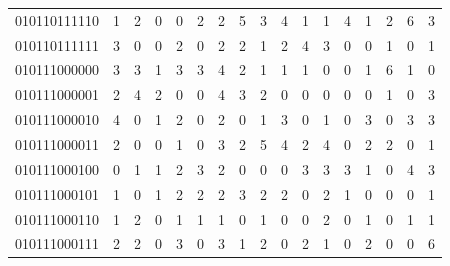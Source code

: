 \documentclass[10pt,a4paper]{article}
\begin{document}
\begin{longtable}{ |c|c|c|c|c|c|c|c|c|c|c|c|c|c|c|c|c| }
    010110111110              & 1                            & 2                                & 0                            & 0                              & 2   & 2   & 5   & 3   & 4   & 1   & 1   & 4   & 1   & 2   & 6   & 3   \\
    010110111111              & 3                            & 0                                & 0                            & 2                              & 0   & 2   & 2   & 1   & 2   & 4   & 3   & 0   & 0   & 1   & 0   & 1   \\
    010111000000              & 3                            & 3                                & 1                            & 3                              & 3   & 4   & 2   & 1   & 1   & 1   & 0   & 0   & 1   & 6   & 1   & 0   \\
    010111000001              & 2                            & 4                                & 2                            & 0                              & 0   & 4   & 3   & 2   & 0   & 0   & 0   & 0   & 0   & 1   & 0   & 3   \\
    010111000010              & 4                            & 0                                & 1                            & 2                              & 0   & 2   & 0   & 1   & 3   & 0   & 1   & 0   & 3   & 0   & 3   & 3   \\
    010111000011              & 2                            & 0                                & 0                            & 1                              & 0   & 3   & 2   & 5   & 4   & 2   & 4   & 0   & 2   & 2   & 0   & 1   \\
    010111000100              & 0                            & 1                                & 1                            & 2                              & 3   & 2   & 0   & 0   & 0   & 3   & 3   & 3   & 1   & 0   & 4   & 3   \\
    010111000101              & 1                            & 0                                & 1                            & 2                              & 2   & 2   & 3   & 2   & 2   & 0   & 2   & 1   & 0   & 0   & 0   & 1   \\
    010111000110              & 1                            & 2                                & 0                            & 1                              & 1   & 1   & 0   & 1   & 0   & 0   & 2   & 0   & 1   & 0   & 1   & 1   \\
    010111000111              & 2                            & 2                                & 0                            & 3                              & 0   & 3   & 1   & 2   & 0   & 2   & 1   & 0   & 2   & 0   & 0   & 6   \\

\end{longtable}
\end{document}
